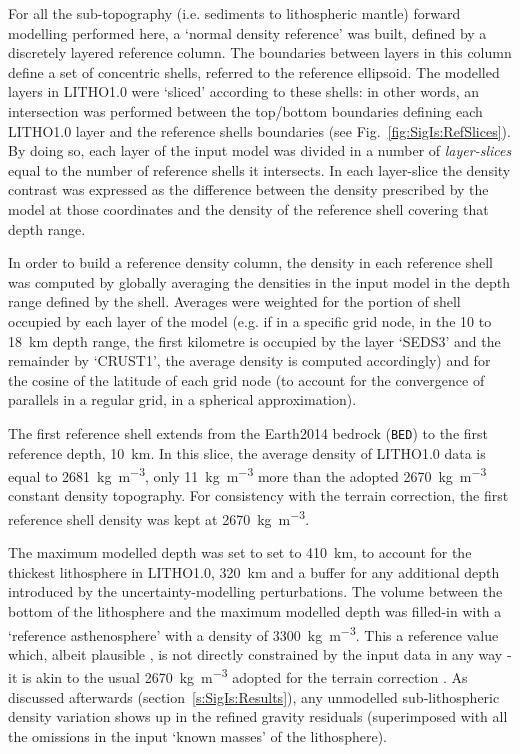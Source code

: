 For all the sub-topography (i.e. sediments to lithospheric mantle) forward modelling performed here, a `normal density reference' was built, defined by a discretely layered reference column.
The boundaries between layers in this column define a set of concentric shells, referred to the reference ellipsoid.
The modelled layers in {LITHO1.0} were `sliced' according to these shells: in other words, an intersection was performed between the top/bottom boundaries defining each {LITHO1.0} layer and the reference shells boundaries (see Fig.~\ref{fig:SigIs:RefSlices}).
By doing so, each layer of the input model was divided in a number of \textit{layer-slices} equal to the number of reference shells it intersects.
In each layer-slice the density contrast was expressed as the difference between the density prescribed by the model at those coordinates and the density of the reference shell covering that depth range.

In order to build a reference density column, the density in each reference shell was computed by globally averaging the densities in the input model in the depth range defined by the shell.
Averages were weighted for the portion of shell occupied by each layer of the model (e.g. if in a specific grid node, in the \num{10} to \SI{18}{km} depth range, the first kilometre is occupied by the layer `SEDS3' and the remainder by `CRUST1', the average density is computed accordingly) and for the cosine of the latitude of each grid node (to account for the convergence of parallels in a regular grid, in a spherical approximation).

The first reference shell extends from the {Earth2014} bedrock (\texttt{BED}) to the first reference depth, \SI{10}{\kilo \metre}.
In this slice, the average density of {LITHO1.0} data is equal to \SI{2681}{\kilo \gram \per \cubic \metre}, only \SI{11}{\kilo \gram \per \cubic \metre} more than the adopted \SI{2670}{\kilo \gram \per \cubic \metre} constant density topography.
For consistency with the terrain correction, the first reference shell density was kept at \SI{2670}{\kilo \gram \per \cubic \metre}.

The maximum modelled depth was set to set to \SI{410}{\kilo \metre}, to account for the thickest lithosphere in {LITHO1.0}, \SI{320}{\kilo \metre} and a buffer for any additional depth introduced by the uncertainty-modelling perturbations.
The volume between the bottom of the lithosphere and the maximum modelled depth was filled-in with a `reference asthenosphere' with a density of \SI{3300}{\kilo \gram \per \cubic \metre}.
This a reference value which, albeit plausible \parencite[e.g.][]{Bormann2002}, is not directly constrained by the input data in any way - it is akin to the usual \SI{2670}{\kilo \gram \per \cubic \metre} adopted for the terrain correction \parencite{Hinze2003}.
As discussed afterwards (section~\ref{s:SigIs:Results}), any unmodelled sub-lithospheric density variation shows up in the refined gravity residuals (superimposed with all the omissions in the input `known masses' of the lithosphere).

